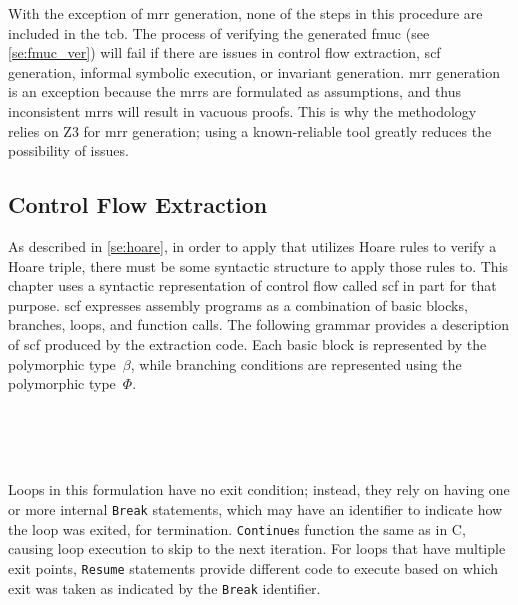 With the exception of \ac{mrr} generation,
none of the steps in this procedure are included in the \ac{tcb}.
The process of verifying the generated \ac{fmuc} (see \cref{se:fmuc_ver})
will fail if there are issues in control flow extraction,
\ac{scf} generation, informal symbolic execution, or invariant generation.
\Ac{mrr} generation is an exception
because the \acp{mrr} are formulated as assumptions,
and thus inconsistent \acp{mrr} will result in vacuous proofs.
This is why the methodology relies on Z3 for \ac{mrr} generation;
using a known-reliable tool greatly reduces the possibility of issues.

\subsection{Control Flow Extraction}\label{sse:cfg_extract}
As described in \cref{se:hoare},
in order to apply  that utilizes Hoare rules to verify a Hoare triple,
there must be some syntactic structure to apply those rules to.
This chapter uses a syntactic representation of control flow called \ac{scf}
in part for that purpose.
\Ac{scf} expresses assembly programs as a combination of basic blocks,
branches, loops, and function calls.
The following grammar provides a description of \ac{scf}
produced by the extraction code.
Each basic block is represented by the polymorphic type~$\beta$,%
while branching conditions are represented using the polymorphic type~$\Phi$.%
\begin{bnf}
   \\
   \\
   \\
\end{bnf}
Loops in this formulation have no exit condition;%
instead, they rely on having one or more internal \texttt{Break} statements,%
which may have an identifier to indicate how the loop was exited, for termination.
\texttt{Continue}s function the same as in C,%
causing loop execution to skip to the next iteration.
For loops that have multiple exit points,
\texttt{Resume} statements provide different code to execute
based on which exit was taken as indicated by the \texttt{Break} identifier.

